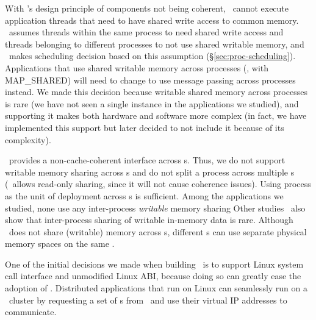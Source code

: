 \documentclass[10pt,times,twocolumn]{z2-article}
\begin{document}
{{{{{{{With \splitkernel's design principle of components not being coherent,
\lego\ cannot execute application threads that need to have shared write access to common memory.
\lego\ assumes threads within the same process to need shared write access
and threads belonging to different processes to not use shared writable memory,
and \lego\ makes scheduling decision based on this assumption (\S\ref{sec:proc-scheduling}).
Applications that use shared writable memory across processes (\eg, with MAP\_SHARED)
will need to change to use message passing across processes instead.
We made this decision because writable shared memory across processes is rare 
(we have not seen a single instance in the applications we studied),
and supporting it makes both hardware and software more complex 
(in fact, we have implemented this support but later decided to not include it because of its complexity).

\lego\ provides a non-cache-coherent interface across \pcomponent{}s.
Thus, we do not support writable memory sharing across \pcomponent{}s
and do not split a process across multiple \pcomponent{}s
(\lego\ allows read-only sharing, since it will not cause coherence issues).
Using process as the unit of deployment across \pcomponent{}s is sufficient. %
Among the applications we studied, none use any inter-process {\em writable} memory sharing
Other studies~\cite{OVC} also show that inter-process sharing of writable in-memory data is rare.
Although \lego\ does not share (writable) memory across \pcomponent{}s, 
different \pcomponent{}s can use separate physical memory spaces on the same \mcomponent.
\fi

One of the initial decisions we made when building \lego\ is to support Linux system call interface 
and unmodified Linux ABI,
because doing so can greatly ease the adoption of \lego.
Distributed applications that run on Linux can seamlessly run on a \lego\ cluster
by requesting a set of \vnode{}s from \lego\ and use their virtual IP addresses to communicate.

}}}}}}}
\end{document}
